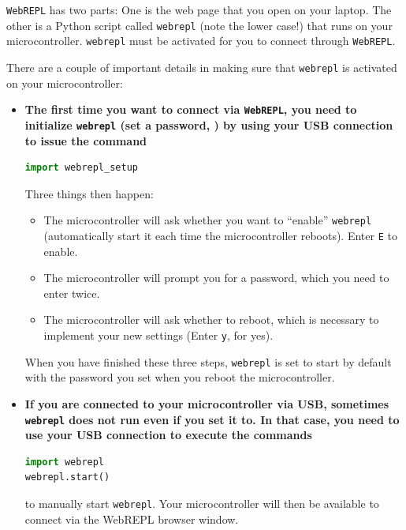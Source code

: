 
\begin{kaobox}[frametitle=Making sure \texttt{webrepl} is active on your microcontroller \dots]
\texttt{WebREPL} has two parts:
One is the web page that you open on your laptop.
The other is a Python script called \texttt{webrepl} (note the lower case!) that runs on your microcontroller.
\texttt{webrepl} must be activated for you to connect through \texttt{WebREPL}.

There are a couple of important details in making sure that \texttt{webrepl} is activated on your microcontroller:
\begin{itemize}
\item \textbf{The first time you want to connect via \texttt{WebREPL}, you need to initialize \texttt{webrepl} (set a password, \etc) by using your USB connection to issue the command}
\begin{lstlisting}[language=Python]
import webrepl_setup
\end{lstlisting}
Three things then happen:
\begin{itemize}
	\item The microcontroller will ask whether you want to ``enable'' \texttt{webrepl} (automatically start it each time the microcontroller reboots). Enter \texttt{E} to enable.
	\item The microcontroller will prompt you for a password, which you need to enter twice.
	\item The microcontroller will ask whether to reboot, which is necessary to implement your new settings (Enter \texttt{y}, for yes).
\end{itemize}
When you have finished these three steps, \texttt{webrepl} is set to start by default with the password you set when you reboot the microcontroller.

\item \textbf{If you are connected to your microcontroller via USB, sometimes \texttt{webrepl} does not run even if you set it to. In that case, you need to use your USB connection to execute the commands}
\begin{lstlisting}[language=Python]
import webrepl
webrepl.start()
\end{lstlisting}
to manually start \texttt{webrepl}. Your microcontroller will then be available to connect via the WebREPL browser window.
\end{itemize}
\end{kaobox}

